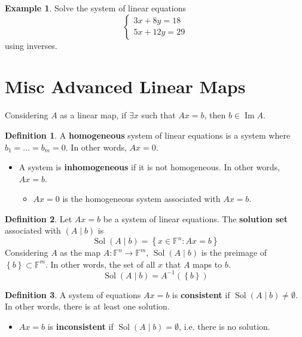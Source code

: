 \documentclass[letterpaper,12pt]{article}
\theoremstyle{definition}
\newtheorem*{definition}{Definition}
\newtheorem*{example}{Example}
\newcommand{\set}[1]{\left\{ #1 \right\}}
\DeclareMathOperator{\Image}{Im}
\DeclareMathOperator{\sol}{Sol}
\begin{document}
\begin{example}
Solve the system of linear equations
\begin{equation*}
    \begin{cases} 3x + 8y = 18 \\ 5x + 12y = 29 \end{cases}
\end{equation*}
using inverses.
\end{example}



\section*{Misc Advanced Linear Maps}

Considering $A$ as a linear map, if $\exists x$ such that $Ax = b$, then $b \in \Image{A}$.


\begin{definition}
A \textbf{homogeneous} system of linear equations is a system where $b_1 = \dots = b_m = 0$. In other words, $Ax = 0$.
\begin{itemize}
    \item A system is \textbf{inhomogeneous} if it is not homogeneous. In other words, $Ax = b$.
    \begin{itemize}
        \item $Ax = 0$ is the homogeneous system associated with $Ax = b$.
    \end{itemize}
\end{itemize}
\end{definition}

\begin{definition}
Let $Ax = b$ be a system of linear equations. The \textbf{solution set} associated with $(A \mid b)$ is
\begin{equation*}
    \boxed{\sol{(A \mid b)} = \set{x \in \mathbb{F}^n : Ax = b}}
\end{equation*}
Considering $A$ as the map $A: \mathbb{F}^n \rightarrow \mathbb{F}^m$, $\sol{(A \mid b)}$ is the preimage of $\set{b} \subset \mathbb{F}^m$. In other words, the set of all $x$ that $A$ maps to $b$.
\begin{equation*}
    \boxed{\sol{(A \mid b)} = A^{-1}(\set{b})}
\end{equation*}
\end{definition}

\begin{definition}
A system of equations $Ax = b$ is \textbf{consistent} if $\sol{(A \mid b)} \neq \emptyset$. In other words, there is at least one solution.
\begin{itemize}
    \item $Ax = b$ is \textbf{inconsistent} if $\sol{(A \mid b)} = \emptyset$, i.e. there is no solution.
\end{itemize}
\end{definition}
\end{document}
